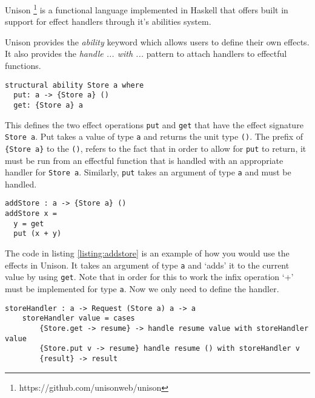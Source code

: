 \documentclass[logo,bsc,singlespacing,parskip]{infthesis}
\begin{document}
Unison \footnote{https://github.com/unisonweb/unison} is a
functional language implemented in Haskell that offers built in support for effect
handlers through it's abilities system.

Unison provides the \emph{ability} keyword which allows users to define their own
effects. It also provides the \emph{handle ... with ...} pattern to attach handlers to effectful functions.

\begin{lstlisting}[caption={The \emph{put} and \emph{store} example in Unison. Note that the \emph{structural} keyword refers to the fact that Unison stores type definitions as a hash. Even if we changed all the variable names it would still view it as the same type. To avoid that behaviour you can swap the \emph{structural} keyword for \emph{unique}}]
structural ability Store a where
  put: a -> {Store a} ()
  get: {Store a} a
\end{lstlisting}

This defines the two effect operations \texttt{put} and \texttt{get} that have
the effect signature \texttt{Store a}. Put takes a value of type \texttt{a} and
returns the unit type \texttt{()}. The prefix of \texttt{\{Store a\}} to the
\texttt{()}, refers to the fact that in order to allow for \texttt{put} to
return, it must be run from an effectful function that is handled with an
appropriate handler for \texttt{Store a}. Similarly, \texttt{put} takes an
argument of type \texttt{a} and must be handled.

\begin{lstlisting}[caption={An example of an effectful function that uses the \texttt{Store} effect}]
addStore : a -> {Store a} ()
addStore x =
  y = get
  put (x + y)
\end{lstlisting}
\label{listing:addstore}

The code in listing \ref{listing:addstore} is an example of how you would use
the effects in Unison. It takes an argument of type \texttt{a} and `adds' it to
the current value by using \texttt{get}. Note that in order for this to work the
infix operation `+' must be implemented for type \texttt{a}. Now we only need to
define the handler.

\begin{lstlisting}[caption={The handler for the \texttt{Store} effect}]
    storeHandler : a -> Request (Store a) a -> a
    storeHandler value = cases
        {Store.get -> resume} -> handle resume value with storeHandler value
        {Store.put v -> resume} handle resume () with storeHandler v
        {result} -> result

\end{lstlisting}
\end{document}
